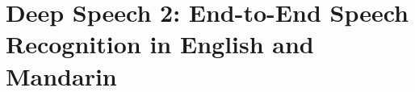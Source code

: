 \chapter[Deep Speech 2]{Deep Speech 2: End-to-End Speech Recognition in English and Mandarin}










